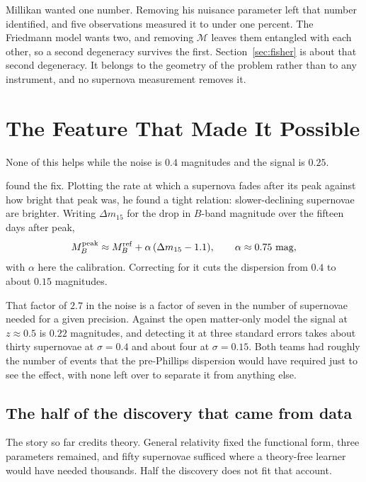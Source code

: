 \documentclass[11pt]{article}
\begin{document}
Millikan wanted one number.  Removing his nuisance parameter left that number
identified, and five observations measured it to under one percent.  The
Friedmann model wants two, and removing $\mathcal{M}$ leaves them entangled
with each other, so a second degeneracy survives the first.
Section~\ref{sec:fisher} is about that second degeneracy.  It belongs to the
geometry of the problem rather than to any instrument, and no supernova
measurement removes it.

\section{The Feature That Made It Possible}

None of this helps while the noise is $0.4$ magnitudes and the signal is
$0.25$.

\citet{Phillips1993} found the fix.  Plotting the rate at which a supernova
fades after its peak against how bright that peak was, he found a tight
relation: slower-declining supernovae are brighter.  Writing $\Delta m_{15}$
for the drop in $B$-band magnitude over the fifteen days after peak,
\begin{equation}\label{eq:phillips}
  M_B^{\rm peak} \approx M_B^{\rm ref} + \alpha\,(\Delta m_{15} - 1.1),
  \qquad \alpha \approx 0.75~\text{mag},
\end{equation}
with $\alpha$ here the \citet{Hamuy1996} calibration.  Correcting for it cuts
the dispersion from $0.4$ to about $0.15$ magnitudes.

That factor of $2.7$ in the noise is a factor of seven in the number of
supernovae needed for a given precision.  Against the open matter-only model
the signal at $z \approx 0.5$ is $0.22$ magnitudes, and detecting it at three
standard errors takes about thirty supernovae at $\sigma = 0.4$ and about four
at $\sigma = 0.15$.  Both teams had roughly the number of events that the
pre-Phillips dispersion would have required just to see the effect, with none
left over to separate it from anything else.

\subsection*{The half of the discovery that came from data}

The story so far credits theory.  General relativity fixed the functional
form, three parameters remained, and fifty supernovae sufficed where a
theory-free learner would have needed thousands.  Half the discovery does not
fit that account.
\end{document}
